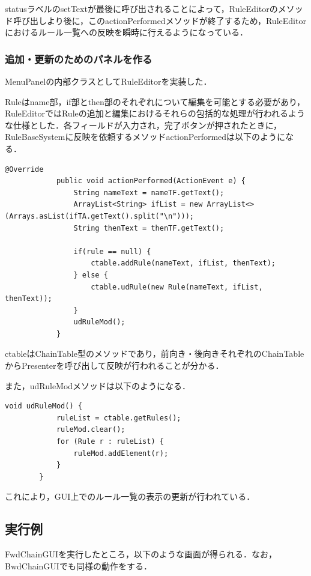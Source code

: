 \documentclass[12pt]{jarticle}
\begin{document}
statusラベルのsetTextが最後に呼び出されることによって，RuleEditorのメソッド呼び出しより後に，このactionPerformedメソッドが終了するため，RuleEditorにおけるルール一覧への反映を瞬時に行えるようになっている．

\subsubsection{追加・更新のためのパネルを作る}
MenuPanelの内部クラスとしてRuleEditorを実装した．

Ruleはname部，if部とthen部のそれぞれについて編集を可能とする必要があり，RuleEditorではRuleの追加と編集におけるそれらの包括的な処理が行われるような仕様とした．各フィールドが入力され，完了ボタンが押されたときに，RuleBaseSystemに反映を依頼するメソッドactionPerformedは以下のようになる．

\begin{lstlisting}[caption=RuleEditorクラスのメソッドactionPerformed, label=ruledone]
            @Override
            public void actionPerformed(ActionEvent e) {
                String nameText = nameTF.getText();
                ArrayList<String> ifList = new ArrayList<>(Arrays.asList(ifTA.getText().split("\n")));
                String thenText = thenTF.getText();
    
                if(rule == null) {
                    ctable.addRule(nameText, ifList, thenText);
                } else {
                    ctable.udRule(new Rule(nameText, ifList, thenText));
                }
                udRuleMod();
            }
\end{lstlisting}

ctableはChainTable型のメソッドであり，前向き・後向きそれぞれのChainTableからPresenterを呼び出して反映が行われることが分かる．

また，udRuleModメソッドは以下のようになる．

\begin{lstlisting}[caption=MenuPanelクラスのメソッドudRuleMod, label=udmod]
        void udRuleMod() {
            ruleList = ctable.getRules();
            ruleMod.clear();
            for (Rule r : ruleList) {
                ruleMod.addElement(r);
            }
        }
\end{lstlisting}

これにより，GUI上でのルール一覧の表示の更新が行われている．

\clearpage

\subsection{実行例}
FwdChainGUIを実行したところ，以下のような画面が得られる．なお，BwdChainGUIでも同様の動作をする．
\end{document}
